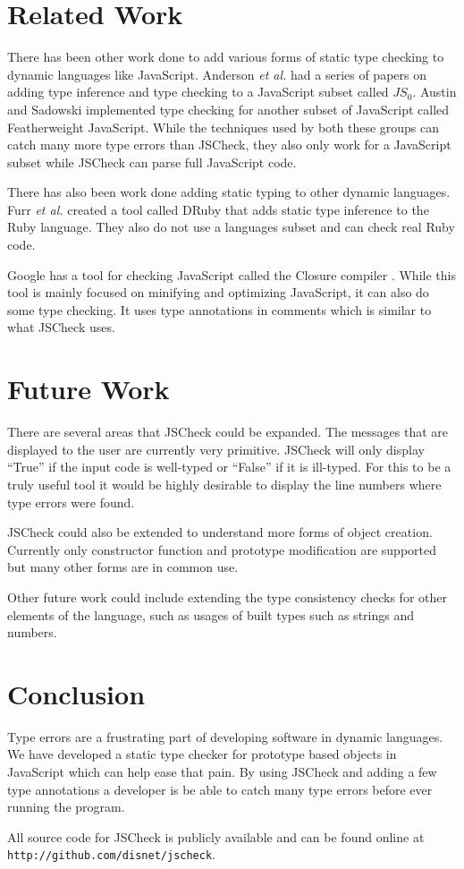 \documentclass{article}
\begin{document}
\section{Related Work}
\label{sec:related}
There has been other work done to add various forms of static type checking to dynamic
languages like JavaScript. Anderson {\em et al.}
\cite{typeinferenceforjavascriptEcoop, typecheckingforjavascript} had a series of papers
on adding type inference and type checking to a JavaScript subset called $JS_0$. Austin
and Sadowski \cite{fwjsStruct} implemented type checking for another subset of JavaScript called 
Featherweight JavaScript. While the techniques used by both these groups can catch 
many more type errors than JSCheck, 
they also only work for a JavaScript subset while JSCheck can parse full JavaScript code.

There has also been work done adding static typing to other dynamic languages. Furr {\em et al.}
\cite{typecheckingruby} created a tool called DRuby that adds static type inference to
the Ruby language. They also do not use a languages subset and can check real Ruby code.

Google has a tool for checking JavaScript called the Closure 
compiler \cite{closureCompiler}. While this tool is mainly focused on minifying
and optimizing JavaScript, it can also do some type checking. It uses type
annotations in comments which is similar to what JSCheck uses.

\section{Future Work}
\label{sec:future}
There are several areas that JSCheck could be expanded. The messages that are displayed
to the user are currently very primitive. JSCheck will only display ``True'' if the
input code is well-typed or ``False'' if it is ill-typed. For this to be a truly useful tool
it would be highly desirable to display the line numbers where type errors were found.

JSCheck could also be extended to understand more forms of object creation. Currently
only constructor function and prototype modification are supported but many other forms
are in common use.

Other future work could include extending the type consistency checks for other elements 
of the language, such as usages of built types such as strings and numbers.

\section{Conclusion}
\label{sec:conclusion}
Type errors are a frustrating part of developing software in dynamic languages.
We have developed a static type checker for prototype based objects in JavaScript which
can help ease that pain.
By using JSCheck and adding a few type annotations a developer is be able to catch many
type errors before ever running the program. 

All source code for JSCheck is publicly available and can be found online at
{\tt http://github.com/disnet/jscheck}.



\end{document}

